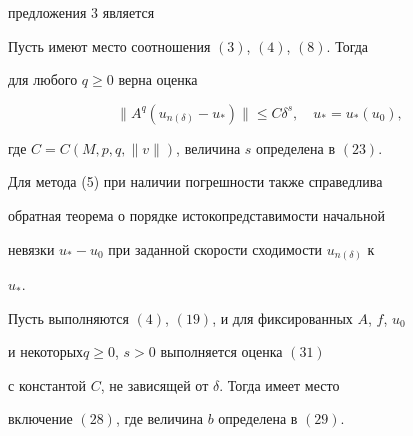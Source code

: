 предложения 3 является 


 


\begin{prop} 


Пусть имеют место соотношения $(3)$, $(4)$, $(8)$. Тогда 


для любого $q\ge0$ верна оценка 


\begin{equation} 


\|A^q(u_{n(\delta)}-u_*)\|\le C\delta^s,\quad 


u_*=u_*(u_0), 


\end{equation} 


где $C=C(M,p,q,\|v\|)$, величина $s$ определена в $(23)$. 


\end{prop} 


 


Для метода (5) при наличии погрешности также справедлива 


обратная теорема о порядке истокопредставимости начальной 


невязки $u_*-u_0$ при заданной скорости сходимости $u_{n(\delta)}$ к 


$u_*$. 


 


\begin{thm} 


Пусть выполняются $(4)$, $(19)$, и для фиксированных $A$, $f$, $u_0$ 


и некоторых\linebreak $q\ge0$, $s>0$ выполняется оценка $(31)$ 


с константой $C$, не зависящей от $\delta$. Тогда имеет место 


включение $(28)$, где величина $b$ определена в $(29)$. 


\end{thm} 


 



